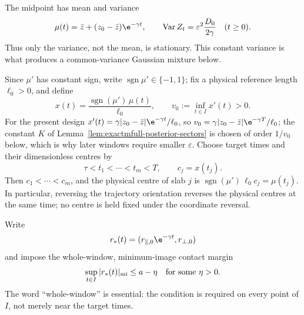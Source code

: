 The midpoint has mean and variance
\begin{equation}
 \mu(t)=\bar z+(z_0-\bar z)\e^{-\gamma t},
 \qquad
 \operatorname{Var}Z_t=\varepsilon^2\frac{D_0}{2\gamma}
 \quad(t\ge0).
 \label{eq:exactmfull-stationary-variance}
\end{equation}
Thus only the variance, not the mean, is stationary.  This constant variance
is what produces a common-variance Gaussian mixture below.

Since \(\mu'\) has constant sign, write \(\operatorname{sgn}\mu'\in\{-1,1\}\);
fix a physical reference length \(\ell_0>0\), and define
\begin{equation}
 x(t)=\frac{\operatorname{sgn}(\mu')\,\mu(t)}{\ell_0},
 \qquad v_0:=\inf_{t\in I}x'(t)>0.
 \label{eq:exactmfull-increasing-coordinate}
\end{equation}
For the present design \(x'(t)=\gamma|z_0-\bar z|\e^{-\gamma t}/\ell_0\), so
\(v_0=\gamma|z_0-\bar z|\e^{-\gamma T}/\ell_0\); the constant \(K\) of
Lemma~\ref{lem:exactmfull-posterior-sectors} is chosen of order \(1/v_0\)
below, which is why later windows require smaller \(\varepsilon\).
Choose target times and their dimensionless centres by
\begin{equation}
 \tau<t_1<\cdots<t_m<T,
 \qquad c_j=x(t_j).
 \label{eq:exactmfull-targets}
\end{equation}
Then \(c_1<\cdots<c_m\), and the physical centre of slab \(j\) is
\(\operatorname{sgn}(\mu')\,\ell_0c_j=\mu(t_j)\).  In particular, reversing the trajectory
orientation reverses the physical centres at the same time; no centre is
held fixed under the coordinate reversal.

Write
\begin{equation}
 r_*(t)=(r_{\parallel,0}\e^{-\gamma t},r_{\perp,0})
 \label{eq:exactmfull-relative-deterministic-path}
\end{equation}
and impose the whole-window, minimum-image contact margin
\begin{equation}
 \sup_{t\in I}|r_*(t)|_{\rm mi}\le a-\eta
 \quad\text{for some }\eta>0.
 \label{eq:exactmfull-whole-window-contact}
\end{equation}
The word ``whole-window'' is essential: the condition is required on every
point of \(I\), not merely near the target times.

